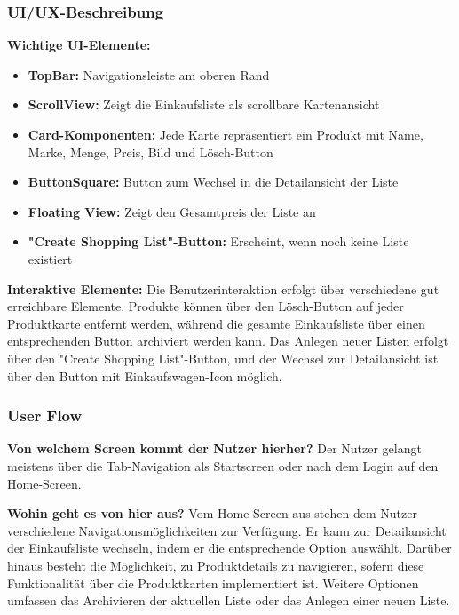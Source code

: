 \subsubsection{UI/UX-Beschreibung}

\textbf{Wichtige UI-Elemente:}
\begin{itemize}
    \item \textbf{TopBar:} Navigationsleiste am oberen Rand
    \item \textbf{ScrollView:} Zeigt die Einkaufsliste als scrollbare Kartenansicht
    \item \textbf{Card-Komponenten:} Jede Karte repräsentiert ein Produkt mit Name, Marke, Menge, Preis, Bild und Lösch-Button
    \item \textbf{ButtonSquare:} Button zum Wechsel in die Detailansicht der Liste
    \item \textbf{Floating View:} Zeigt den Gesamtpreis der Liste an
    \item \textbf{"Create Shopping List"-Button:} Erscheint, wenn noch keine Liste existiert
\end{itemize}

\noindent\textbf{Interaktive Elemente:}
Die Benutzerinteraktion erfolgt über verschiedene gut erreichbare Elemente. Produkte können über den Lösch-Button auf jeder Produktkarte entfernt werden, während die gesamte Einkaufsliste über einen entsprechenden Button archiviert werden kann. Das Anlegen neuer Listen erfolgt über den "Create Shopping List"-Button, und der Wechsel zur Detailansicht ist über den Button mit Einkaufswagen-Icon möglich.

\subsubsection{User Flow}

\textbf{Von welchem Screen kommt der Nutzer hierher?}
Der Nutzer gelangt meistens über die Tab-Navigation als Startscreen oder nach dem Login auf den Home-Screen.

\noindent\textbf{Wohin geht es von hier aus?}
Vom Home-Screen aus stehen dem Nutzer verschiedene Navigationsmöglichkeiten zur Verfügung. Er kann zur Detailansicht der Einkaufsliste wechseln, indem er die entsprechende Option auswählt. Darüber hinaus besteht die Möglichkeit, zu Produktdetails zu navigieren, sofern diese Funktionalität über die Produktkarten implementiert ist. Weitere Optionen umfassen das Archivieren der aktuellen Liste oder das Anlegen einer neuen Liste.

